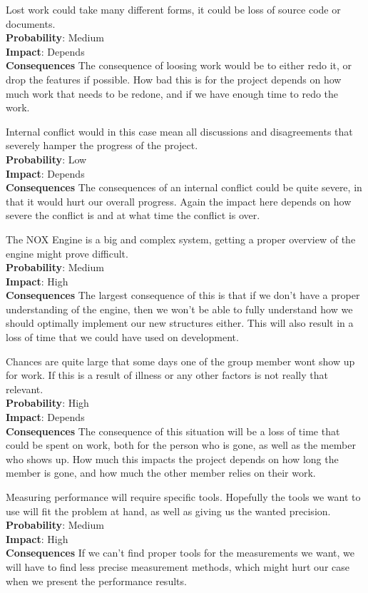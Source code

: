 Lost work could take many different forms, it could be loss of source code or documents.\\
\textbf{Probability}: Medium\\
\textbf{Impact}: Depends\\
\textbf{Consequences}
The consequence of loosing work would be to either redo it, or drop the features if possible.
How bad this is for the project depends on how much work that needs to be redone, and
if we have enough time to redo the work.

Internal conflict would in this case mean all discussions and disagreements that severely
hamper the progress of the project.\\
\textbf{Probability}: Low\\
\textbf{Impact}: Depends\\
\textbf{Consequences}
The consequences of an internal conflict could be quite severe, in that it would hurt
our overall progress. Again the impact here depends on how severe the conflict is
and at what time the conflict is over.

The NOX Engine is a big and complex system, getting a proper overview of the engine
might prove difficult.\\
\textbf{Probability}: Medium\\
\textbf{Impact}: High\\
\textbf{Consequences}
The largest consequence of this is that if we don't have a proper understanding of the engine,
then we won't be able to fully understand how we should optimally implement our new structures either.
This will also result in a loss of time that we could have used on development.

Chances are quite large that some days one of the group member wont show up for work.
If this is a result of illness or any other factors is not really that relevant.\\
\textbf{Probability}: High\\
\textbf{Impact}: Depends\\
\textbf{Consequences}
The consequence of this situation will be a loss of time that could be spent on work, 
both for the person who is gone, as well as the member who shows up.
How much this impacts the project depends on how long the member is gone,
and how much the other member relies on their work.

Measuring performance will require specific tools. 
Hopefully the tools we want to use will fit the problem at hand, 
as well as giving us the wanted precision.\\
\textbf{Probability}: Medium\\
\textbf{Impact}: High\\
\textbf{Consequences}
If we can't find proper tools for the measurements we want,
we will have to find less precise measurement methods,
which might hurt our case when we present the performance results.

